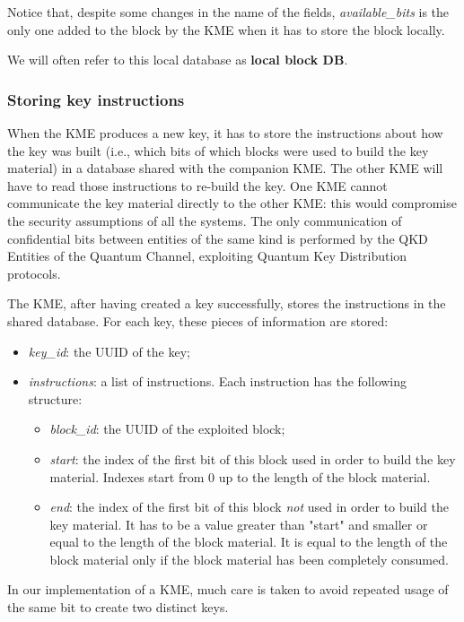 Notice that, despite some changes in the name of the fields, \textit{available\_bits} is the only one added to the block by the KME when it has to store the block locally.

We will often refer to this local database as \textbf{local block DB}.

\subsubsection{Storing key instructions}
When the KME produces a new key, it has to store the instructions about how the key was built (i.e., which bits of which blocks were used to build the key material) in a database shared with the companion KME. The other KME will have to read those instructions to re-build the key. One KME cannot communicate the key material directly to the other KME: this would compromise the security assumptions of all the systems. The only communication of confidential bits between entities of the same kind is performed by the QKD Entities of the Quantum Channel, exploiting Quantum Key Distribution protocols.

The KME, after having created a key successfully, stores the instructions in the shared database. For each key, these pieces of information are stored:

\begin{itemize}
    \item \textit{key\_id}: the UUID of the key;
    \item \textit{instructions}: a list of instructions. Each instruction has the following structure:
    \begin{itemize}
        \item \textit{block\_id}: the UUID of the exploited block;
        \item \textit{start}: the index of the first bit of this block used in order to build the key material. Indexes start from 0 up to the length of the block material.
        \item \textit{end}: the index of the first bit of this block \textit{not} used in order to build the key material. It has to be a value greater than "start" and smaller or equal to the length of the block material. It is equal to the length of the block material only if the block material has been completely consumed.
    \end{itemize}
\end{itemize}

In our implementation of a KME, much care is taken to avoid repeated usage of the same bit to create two distinct keys.


